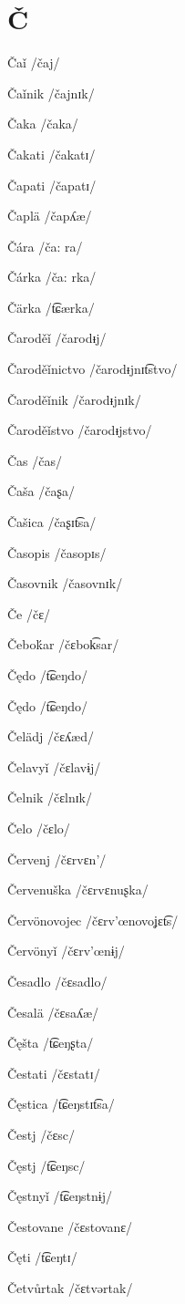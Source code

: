 \chapter{Č}

Čaǐ /čaj/

Čaǐnik /čajnɪk/

Čaka /čaka/

Čakati /čakatɪ/

Čapati /čapatɪ/

Čaplä /čapʎæ/

Čára /ča: ra/

Čárka /ča: rka/

Čärka /t͡ɕærka/

Čaroděǐ /čarodᵻj/

Čaroděǐnictvo /čarodᵻjnɪt͡stvo/

Čaroděǐnik /čarodᵻjnɪk/

Čaroděǐstvo /čarodᵻjstvo/

Čas /čas/

Čaša /čaʂa/

Čašica /čaʂɪt͡sa/

Časopis /časopɪs/

Časovnik /časovnɪk/

Če /čɛ/

Čeboḱar /čɛbok͡sar/

Čędo /t͡ɕeŋdo/

Čędo /t͡ɕeŋdo/

Čelädj /čɛʎæd/

Čelavyǐ /čɛlavɨj/

Čelnik /čɛlnɪk/

Čelo /čɛlo/

Červenj /čɛrvɛn’/

Červenuška /čɛrvɛnuʂka/

Červönovojec /čɛrv’œnovoʝɛt͡s/

Červönyǐ /čɛrv’œnɨj/

Česadlo /čɛsadlo/

Česalä /čɛsaʎæ/

Čęšta /t͡ɕeŋʂta/

Čestati /čɛstatɪ/

Čęstica /t͡ɕeŋstɪt͡sa/

Čestj /čɛsc/

Čęstj /t͡ɕeŋsc/

Čęstnyǐ /t͡ɕeŋstnɨj/

Čestovane /čɛstovanɛ/

Čęti /t͡ɕeŋtɪ/

Četvůrtak /čɛtvərtak/

